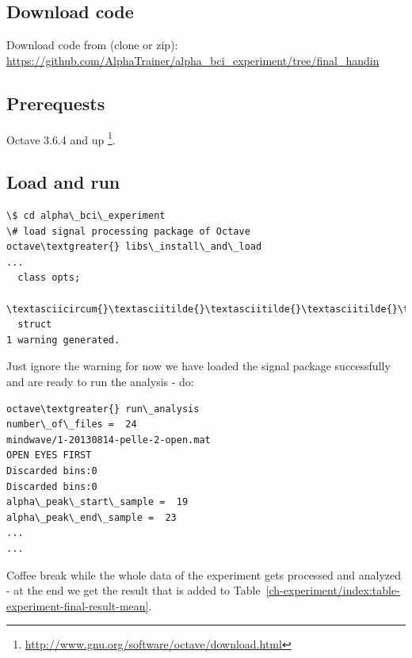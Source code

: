 \documentclass[a4paper,10pt,english,lof,lot,twoside]{puthesis}
\begin{document}
\subsection{Download code}
\label{appendix_experiment:download-code}
Download code from (clone or zip): \href{https://github.com/AlphaTrainer/alpha\_bci\_experiment/tree/final\_handin}{https://github.com/AlphaTrainer/alpha\_bci\_experiment/tree/final\_handin}


\subsection{Prerequests}
\label{appendix_experiment:prerequests}
Octave 3.6.4 and up \footnote{
\href{http://www.gnu.org/software/octave/download.html}{http://www.gnu.org/software/octave/download.html}
}.


\subsection{Load and run}
\label{appendix_experiment:load-and-run}
\begin{Verbatim}[commandchars=\\\{\}]
\$ cd alpha\_bci\_experiment
\# load signal processing package of Octave
octave\textgreater{} libs\_install\_and\_load
...
  class opts;
  \textasciicircum{}\textasciitilde{}\textasciitilde{}\textasciitilde{}\textasciitilde{}
  struct
1 warning generated.
\end{Verbatim}

Just ignore the warning for now we have loaded the signal package successfully
and are ready to run the analysis - do:

\begin{Verbatim}[commandchars=\\\{\}]
octave\textgreater{} run\_analysis
number\_of\_files =  24
mindwave/1-20130814-pelle-2-open.mat
OPEN EYES FIRST
Discarded bins:0
Discarded bins:0
alpha\_peak\_start\_sample =  19
alpha\_peak\_end\_sample =  23
...
...
\end{Verbatim}

Coffee break while the whole data of the experiment gets processed and
analyzed - at the end we get the result that is added to Table \ref{ch-experiment/index:table-experiment-final-result-mean}.
\label{appendix_experiment_mindwave_fora_posts::doc}
\end{document}
